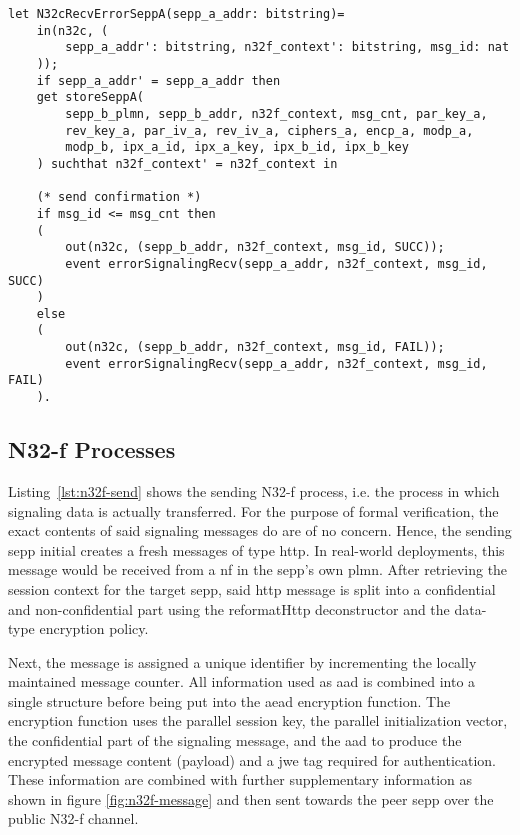 \begin{lstlisting}[caption={Definition of the receiving error signaling process},label={lst:n32c-error-recv},firstnumber=427]
let N32cRecvErrorSeppA(sepp_a_addr: bitstring)=
    in(n32c, (
        sepp_a_addr': bitstring, n32f_context': bitstring, msg_id: nat
    ));
    if sepp_a_addr' = sepp_a_addr then
    get storeSeppA(
        sepp_b_plmn, sepp_b_addr, n32f_context, msg_cnt, par_key_a,
        rev_key_a, par_iv_a, rev_iv_a, ciphers_a, encp_a, modp_a,
        modp_b, ipx_a_id, ipx_a_key, ipx_b_id, ipx_b_key
    ) suchthat n32f_context' = n32f_context in

    (* send confirmation *)
    if msg_id <= msg_cnt then
    (
        out(n32c, (sepp_b_addr, n32f_context, msg_id, SUCC));
        event errorSignalingRecv(sepp_a_addr, n32f_context, msg_id, SUCC)
    )
    else
    (
        out(n32c, (sepp_b_addr, n32f_context, msg_id, FAIL));
        event errorSignalingRecv(sepp_a_addr, n32f_context, msg_id, FAIL)
    ).
\end{lstlisting}

\subsection{N32-f Processes}

Listing~\ref{lst:n32f-send} shows the sending N32-f process, i.e. the process in which signaling data is actually transferred.
For the purpose of formal verification, the exact contents of said signaling messages do are of no concern.
Hence, the sending \gls{sepp} initial creates a fresh messages of type {\sffamily http}.
In real-world deployments, this message would be received from a \gls{nf} in the \gls{sepp}'s own \gls{plmn}.
After retrieving the session context for the target \gls{sepp}, said \gls{http} message is split into a confidential and non-confidential part using the {\sffamily reformatHttp} deconstructor and the data-type encryption policy.

Next, the message is assigned a unique identifier by incrementing the locally maintained message counter.
All information used as \gls{aad} is combined into a single structure before being put into the \gls{aead} encryption function.
The encryption function uses the parallel session key, the parallel initialization vector, the confidential part of the signaling message, and the \gls{aad} to produce the encrypted message content ({\sffamily payload}) and a \gls{jwe} tag required for authentication.
These information are combined with further supplementary information as shown in figure \ref{fig:n32f-message} and then sent towards the peer \gls{sepp} over the public N32-f channel.

